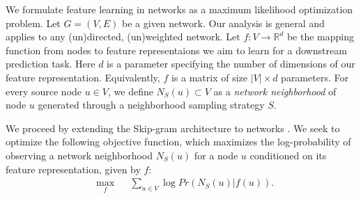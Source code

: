 
We formulate feature learning in networks as a maximum likelihood optimization problem. Let $G = (V, E)$ be a given network. Our analysis is general and applies to any (un)directed, (un)weighted network. 
Let $f: V \rightarrow \mathbb{R}^d$ be the mapping function from nodes to feature representaions we aim to learn for a downstream prediction task. Here $d$ is a parameter specifying the number of dimensions of our feature representation. %
Equivalently, $f$ is a matrix of size $|V| \times d$ parameters. 
%
For every source node $u \in V$, we define $N_S(u) \subset V$ as a {\em network neighborhood} of node $u$ generated through a neighborhood sampling strategy $S$. 

We proceed by extending the Skip-gram architecture to networks \cite{word2vec,deepwalk}. 
We seek to optimize the following objective function, which maximizes the log-probability of observing a network neighborhood $N_S(u)$ for a node $u$ conditioned on its feature representation, given by $f$:
%
\vspace{-0.05in}
\begin{equation}\label{eq:rawObjFn}
\begin{aligned}
& \underset{f}{\text{max}}
& &  \sum_{u \in V}\log Pr(N_S(u)| f(u)).
\end{aligned}
\end{equation}

